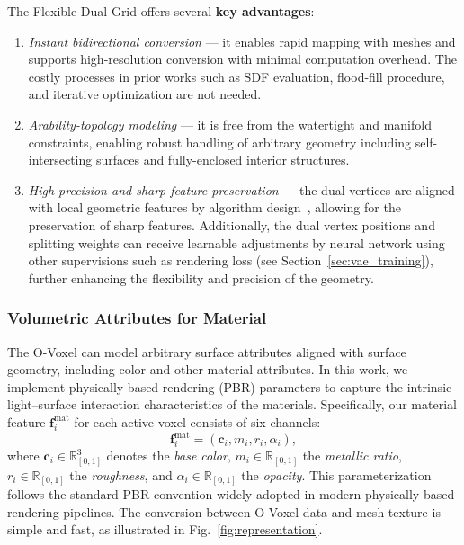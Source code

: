 \documentclass[10pt,twocolumn,letterpaper]{article}
\begin{document}
\smallskip
\noindent The Flexible Dual Grid offers several \textbf{key advantages}:
\begin{enumerate}
	\item \emph{Instant bidirectional conversion} — it enables rapid mapping with meshes and supports high-resolution conversion with minimal computation overhead. 
	The costly processes in prior works such as SDF evaluation, flood-fill procedure, and iterative optimization are not needed.
	\item \emph{Arability-topology modeling} — it is free from the watertight and manifold constraints, enabling robust handling of arbitrary geometry including self-intersecting surfaces and fully-enclosed interior structures. 
	\item \emph{High precision and sharp feature preservation} — the dual vertices are aligned with local geometric features by algorithm design~\cite{ju2002dual}, allowing for the preservation of sharp features. Additionally, the dual vertex positions and splitting weights can receive learnable adjustments by neural network using other supervisions such as rendering loss (see Section~\ref{sec:vae_training}), further enhancing the flexibility and precision of the geometry. 
\end{enumerate}

\subsubsection{Volumetric Attributes for Material}

The O-Voxel can model arbitrary surface attributes aligned with surface geometry, including color and other material attributes. In this work, we implement physically-based rendering (PBR) parameters to capture the intrinsic light–surface interaction characteristics of the materials. Specifically, our material feature $\boldsymbol{f}^{\text{mat}}_i$ for each active voxel consists of six channels:
\begin{equation}
	\boldsymbol{f}^{\text{mat}}_i = (\boldsymbol{c}_i, m_i, r_i, \alpha_i),
\end{equation}
where $\boldsymbol{c}_i \in \mathbb{R}_{[0,1]}^3$ denotes the \emph{base color}, 
$m_i \in \mathbb{R}_{[0,1]}$ the \emph{metallic ratio}, 
$r_i \in \mathbb{R}_{[0,1]}$ the \emph{roughness}, 
and $\alpha_i \in \mathbb{R}_{[0,1]}$ the \emph{opacity}.
This parameterization follows the standard PBR convention widely adopted in modern physically-based rendering pipelines.
The conversion between O-Voxel data and mesh texture is simple and fast, as illustrated in Fig.~\ref{fig:representation}.
\end{document}

